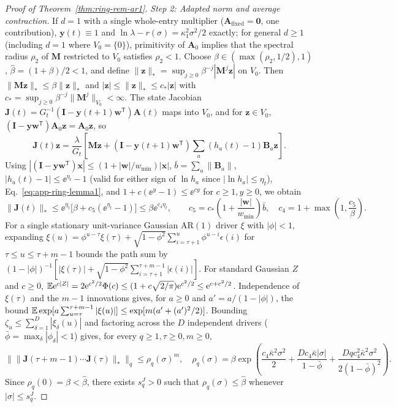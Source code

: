 \begin{proof}[Proof of Theorem~{\upshape\ref{thm:ring-rem-ar1}}]
\emph{Step 2: Adapted norm and average contraction.} If $d = 1$ with a single whole-entry multiplier ($\mathbf{A}_{\mathrm{fixed}} = \mathbf{0}$, one contribution), $\mathbf{y}(t) \equiv 1$ and $\ln\lambda - r(\sigma) = \kappa_1^2\sigma^2/2$ exactly; for general $d \ge 1$ (including $d = 1$ where $V_0 = \{0\}$), primitivity of $\mathbf{A}_0$ implies that the spectral radius $\rho_2$ of $\mathbf{M}$ restricted to $V_0$ satisfies $\rho_2 < 1$. Choose $\beta \in (\max(\rho_2, 1/2), 1)$, $\hat{\beta} = (1 + \beta)/2 < 1$, and define $\|\mathbf{z}\|_* = \sup_{j \ge 0} \beta^{-j}|\mathbf{M}^j\mathbf{z}|$ on $V_0$. Then $\|\mathbf{M}\mathbf{z}\|_* \le \beta\|\mathbf{z}\|_*$ and $|\mathbf{z}| \le \|\mathbf{z}\|_* \le c_*|\mathbf{z}|$ with $c_* = \sup_{j \ge 0} \beta^{-j}\|\mathbf{M}^j\|_{V_0} < \infty$. The state Jacobian $\mathbf{J}(t) = G_t^{-1}(\mathbf{I} - \mathbf{y}(t + 1)\mathbf{w}^{\mathsf{T}})\mathbf{A}(t)$ maps into $V_0$, and for $\mathbf{z} \in V_0$, $(\mathbf{I} - \mathbf{y}\mathbf{w}^{\mathsf{T}})\mathbf{A}_0\mathbf{z} = \mathbf{A}_0\mathbf{z}$, so
\[
\mathbf{J}(t)\mathbf{z} = \frac{\lambda}{G_t}\left[\mathbf{M}\mathbf{z} + (\mathbf{I} - \mathbf{y}(t + 1)\mathbf{w}^{\mathsf{T}})\sum_a (h_a(t) - 1)\mathbf{B}_a\mathbf{z}\right].
\]
Using $|(\mathbf{I} - \mathbf{y}\mathbf{w}^{\mathsf{T}})\mathbf{x}| \le (1 + |\mathbf{w}|/w_{\min})|\mathbf{x}|$, $\bar{b} = \sum_a \|\mathbf{B}_a\|$, $|h_a(t) - 1| \le \ee^{\eta_t} - 1$ (valid for either sign of $\ln h_a$ since $|\ln h_a| \le \eta_t$), Eq.~\eqref{eq:app-ring-lemma1}, and $1 + c(\ee^y - 1) \le \ee^{cy}$ for $c \ge 1, y \ge 0$, we obtain
\[
\|\mathbf{J}(t)\|_* \le \ee^{\eta_t}\bigl[\beta + c_5(\ee^{\eta_t} - 1)\bigr] \le \beta\ee^{c_4\eta_t}, \qquad c_5 = c_*\left(1 + \frac{|\mathbf{w}|}{w_{\min}}\right)\bar{b}, \quad c_4 = 1 + \max\!\left(1, \frac{c_5}{\beta}\right).
\]
For a single stationary unit-variance Gaussian $\mathrm{AR}(1)$ driver $\xi$ with $|\phi| < 1$, expanding $\xi(u) = \phi^{u-\tau}\xi(\tau) + \sqrt{1 - \phi^2}\sum_{i=\tau+1}^u \phi^{u-i}\epsilon(i)$ for $\tau \le u \le \tau + m - 1$ bounds the path sum by $(1 - |\phi|)^{-1}[|\xi(\tau)| + \sqrt{1 - \phi^2}\sum_{i=\tau+1}^{\tau+m-1} |\epsilon(i)|]$. For standard Gaussian $Z$ and $c \ge 0$, $\mathbb{E}\mathrm{e}^{c|Z|} = 2\mathrm{e}^{c^2/2}\Phi(c) \le (1 + c\sqrt{2/\pi})\mathrm{e}^{c^2/2} \le \mathrm{e}^{c + c^2/2}$. Independence of $\xi(\tau)$ and the $m - 1$ innovations gives, for $a \ge 0$ and $a' = a/(1 - |\phi|)$, the bound $\mathbb{E}\exp[a\sum_{u=\tau}^{\tau+m-1} |\xi(u)|] \le \exp[m(a' + (a')^2/2)]$. Bounding $\zeta_u \le \sum_{\delta=1}^D |\xi_\delta(u)|$ and factoring across the $D$ independent drivers ($\bar{\phi} = \max_\delta |\phi_\delta| < 1$) gives, for every $q \ge 1, \tau \ge 0, m \ge 0$,
\[
\bigl\|\|\mathbf{J}(\tau + m - 1)\cdots\mathbf{J}(\tau)\|_*\bigr\|_q \le \rho_q(\sigma)^m, \quad \rho_q(\sigma) = \beta\exp\!\left(\frac{c_4\bar{\kappa}^2\sigma^2}{2} + \frac{D c_4\bar{\kappa}|\sigma|}{1 - \bar{\phi}} + \frac{D q c_4^2\bar{\kappa}^2\sigma^2}{2(1 - \bar{\phi})^2}\right).
\]
Since $\rho_q(0) = \beta < \hat{\beta}$, there exists $s_q^J > 0$ such that $\rho_q(\sigma) \le \hat{\beta}$ whenever $|\sigma| \le s_q^J$.


\end{proof}

